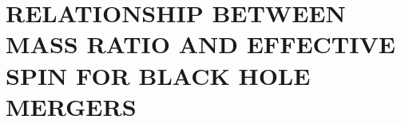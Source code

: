 \section{\texorpdfstring{\MakeUppercase{relationship between mass ratio and effective spin for black hole mergers}}{relationship between mass ratio and effective spin for black hole mergers}}
\label{sec:chapter-X}


